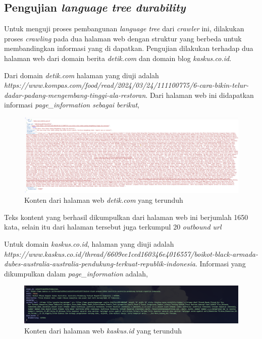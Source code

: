 \subsection{Pengujian \emph{language tree durability}}

Untuk menguji proses pembangunan \emph{language tree} dari \emph{crawler} ini, dilakukan proses \emph{crawling} pada dua halaman web dengan struktur yang berbeda untuk membandingkan informasi yang di dapatkan. Pengujian dilakukan terhadap dua halaman web dari domain berita \emph{detik.com} dan domain blog \emph{kaskus.co.id}.

Dari domain \emph{detik.com} halaman yang diuji adalah \emph{https://www.kompas.com/food/read/2024/03/24/111100775/6-cara-bikin-telur-dadar-padang-mengembang-tinggi-ala-restoran}. Dari halaman web ini didapatkan informasi \emph{page\_information sebagai berikut},

\begin{figure}[H]
  \centering
  \includegraphics[keepaspectratio, width=14cm]{gambar/detik-bench-pageinfo.png}
  \caption{Konten dari halaman web \emph{detik.com} yang terunduh}
  \label{gambar:detik-bench-pageinfo}
\end{figure}

Teks kontent yang berhasil dikumpulkan dari halaman web ini berjumlah 1650 kata, selain itu dari halaman tersebut juga terkumpul 20 \emph{outbound url}

Untuk domain \emph{kaskus.co.id}, halaman yang diuji adalah \emph{https://www.kaskus.co.id/thread/6609ee1ced160346e4016557/boikot-black-armada-dubes-australia-australia-pendukung-terkuat-republik-indonesia}. Informasi yang dikumpulkan dalam \emph{page\_information} adalah,

\begin{figure}[H]
  \centering
  \includegraphics[keepaspectratio, width=14cm]{gambar/kaskus-bench-pageinfo.png}
  \caption{Konten dari halaman web \emph{kaskus.id} yang terunduh}
  \label{gambar:kaskus-bench-pageinfo}
\end{figure}

